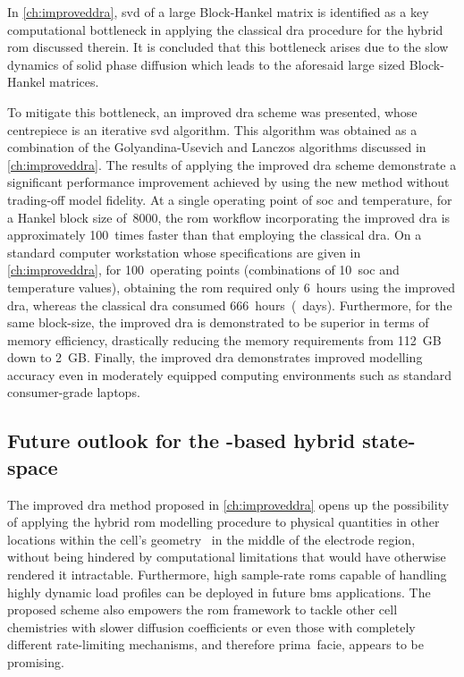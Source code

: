 In \cref{ch:improveddra}, \gls{svd} of a large Block-Hankel matrix is identified
as a key computational bottleneck  in applying the classical \gls{dra} procedure
for the hybrid \gls{rom} discussed therein. It is concluded that this bottleneck
arises due  to the  slow dynamics of  solid phase diffusion  which leads  to the
aforesaid large sized Block-Hankel matrices.

To mitigate this  bottleneck, an improved \gls{dra} scheme  was presented, whose
centrepiece is an iterative \gls{svd}  algorithm. This algorithm was obtained as
a  combination of  the Golyandina-Usevich  and Lanczos  algorithms discussed  in
\cref{ch:improveddra}.  The results  of applying  the improved  \gls{dra} scheme
demonstrate  a significant  performance improvement  achieved by  using the  new
method  without trading-off  model  fidelity.  At a  single  operating point  of
\gls{soc}  and temperature,  for  a  Hankel block  size  of~8000, the  \gls{rom}
workflow incorporating the improved  \gls{dra} is approximately 100~times faster
than that employing the classical  \gls{dra}. On a standard computer workstation
whose  specifications  are  given in  \cref{ch:improveddra},  for  100~operating
points  (combinations of  10~\gls{soc}  and temperature  values), obtaining  the
\gls{rom}  required  only 6~hours  using  the  improved \gls{dra},  whereas  the
classical \gls{dra}  consumed 666~hours~(~days). Furthermore,  for the
same block-size, the improved \gls{dra} is  demonstrated to be superior in terms
of memory efficiency,  drastically reducing the memory  requirements from 112~GB
down to  2~GB. Finally, the  improved \gls{dra} demonstrates  improved modelling
accuracy even  in moderately  equipped computing  environments such  as standard
consumer-grade laptops.

\subsection{Future outlook for the -based hybrid state-space }

The improved  \gls{dra} method  proposed in  \cref{ch:improveddra} opens  up the
possibility of  applying the  hybrid \gls{rom}  modelling procedure  to physical
quantities in  other locations within the  cell's geometry \eg~in the  middle of
the electrode region,  without being hindered by  computational limitations that
would  have otherwise  rendered  it intractable.  Furthermore, high  sample-rate
\glspl{rom} capable of handling highly dynamic  load profiles can be deployed in
future \gls{bms} applications.  The proposed scheme also  empowers the \gls{rom}
framework to tackle other cell chemistries with slower diffusion coefficients or
even  those with  completely different  rate-limiting mechanisms,  and therefore
prima~facie, appears to be promising.

